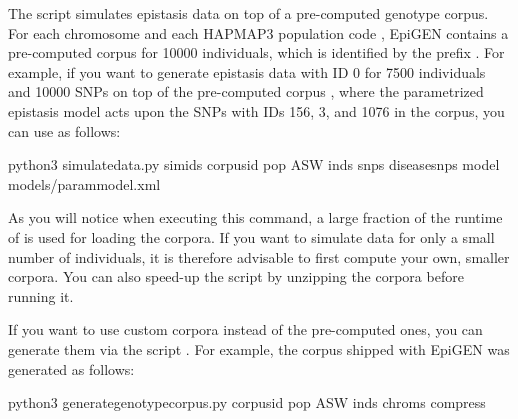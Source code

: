 \documentclass[a4paper,10pt,english]{sphinxhowto}
\begin{document}
The script  simulates epistasis data on top of a pre-computed genotype corpus. For each chromosome  and each HAPMAP3 population code , EpiGEN contains a pre-computed corpus for 10000 individuals, which is identified by the prefix . For example, if you want to generate epistasis data with ID 0 for 7500 individuals and 10000 SNPs on top of the pre-computed corpus , where the parametrized epistasis model  acts upon the SNPs with IDs 156, 3, and 1076 in the corpus, you can use  as follows:

\begin{sphinxVerbatim}[commandchars=\\\{\}]
python3 simulate\PYGZus{}data.py \PYGZhy{}\PYGZhy{}sim\PYGZhy{}ids  \PYGZhy{}\PYGZhy{}corpus\PYGZhy{}id  \PYGZhy{}\PYGZhy{}pop ASW \PYGZhy{}\PYGZhy{}inds  \PYGZhy{}\PYGZhy{}snps  \PYGZhy{}\PYGZhy{}disease\PYGZhy{}snps    \PYGZhy{}\PYGZhy{}model models/param\PYGZus{}model.xml  
\end{sphinxVerbatim}

As you will notice when executing this command, a large fraction of the runtime of  is used for loading the corpora. If you want to simulate data for only a small number of individuals, it is therefore advisable to first compute your own, smaller corpora. You can also speed-up the script by unzipping the corpora before running it.

If you want to use custom corpora instead of the pre-computed ones, you can generate them via the script . For example, the corpus  shipped with EpiGEN was generated as follows:

\begin{sphinxVerbatim}[commandchars=\\\{\}]
python3 generate\PYGZus{}genotype\PYGZus{}corpus.py \PYGZhy{}\PYGZhy{}corpus\PYGZhy{}id  \PYGZhy{}\PYGZhy{}pop ASW \PYGZhy{}\PYGZhy{}inds  \PYGZhy{}\PYGZhy{}chroms  \PYGZhy{}\PYGZhy{}compress 
\end{sphinxVerbatim}
\end{document}

